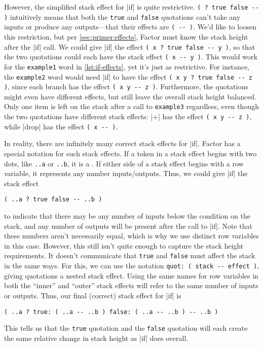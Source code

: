 
However, the simplified stack effect for \factor|if| is quite restrictive.
%
\Verb|( ? true false -- )|
%
intuitively means that both the \Verb|true| and \Verb|false| quotations
can't take any inputs or produce any outputs---that their effects are
%
\Verb|( -- )|.
%
We'd like to loosen this restriction, but per \cref{sec:primer:effects}, Factor
must know the stack height after the \factor|if| call.  We could give
\factor|if| the effect
%
\Verb|( x ? true false -- y )|,
%
so that the two quotations could each have the stack effect
%
\Verb|( x -- y )|.
%
This would work for the \Verb|example1| word in \vref{lst:if-effects}, yet
it's just as restrictive.  For instance, the \Verb|example2| word would need
\factor|if| to have the effect
%
\Verb|( x y ? true false -- z )|,
%
since each branch has the effect
%
\Verb|( x y -- z )|.
%
Furthermore, the quotations might even have different effects, but still leave
the overall stack height balanced.  Only one item is left on the stack after a
call to \Verb|example3| regardless, even though the two quotations have
different stack effects: \factor|+| has the effect
%
\Verb|( x y -- z )|,
%
while \factor|drop| has the effect
%
\Verb|( x -- )|.

In reality, there are infinitely many correct stack effects for \factor|if|.
Factor has a special notation for such  stack effects.
If a token in a stack effect begins with two dots, like \Verb|..a| or
\Verb|..b|, it is a .  If either side of a stack effect
begins with a row variable, it represents any number inputs/outputs.  Thus, we
could give \factor|if| the stack effect
%
\begin{center} \Verb|( ..a ? true false -- ..b )| \end{center}
%
\noindent to indicate that there may be any number of inputs below the
condition on the stack, and any number of outputs will be present after the
call to \factor|if|.  Note that these numbers aren't necessarily equal, which
is why we use distinct row variables in this case.  However, this still isn't
quite enough to capture the stack height requirements.  It doesn't communicate
that \Verb|true| and \Verb|false| must affect the stack in the same ways.
For this, we can use the notation
%
\Verb|quot: ( stack -- effect )|,
%
giving quotations a nested stack effect.  Using the same names for row
variables in both the ``inner'' and ``outer'' stack effects will refer to the
same number of inputs or outputs.  Thus, our final (correct) stack effect for
\factor|if| is 
%
\begin{center}
%
  \Verb|( ..a ? true: ( ..a -- ..b ) false: ( ..a -- ..b ) -- ..b )|
%
\end{center}
%
\noindent This tells us that the \Verb|true| quotation and the \Verb|false|
quotation will each create the same relative change in stack height as
\factor|if| does overall.

